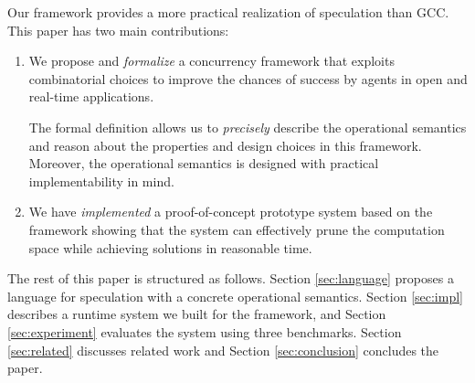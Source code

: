 Our framework provides a more practical realization of speculation than GCC.
%
%
% 
% 
%
This paper has two main contributions:
\begin{enumerate}
\item We propose and {\em formalize} a concurrency framework that 
exploits combinatorial choices to improve the chances of success
by agents in open and real-time applications.

The formal definition allows us to {\em precisely}
describe the operational semantics and reason about the properties and
design choices in this framework.
Moreover, the operational semantics is designed with practical
implementability in mind.
\item We have {\em implemented} a proof-of-concept prototype system 
based on the framework showing
that the system can effectively prune the 
computation space while achieving solutions in reasonable time.
\end{enumerate}

The rest of this paper is structured as follows.
Section \ref{sec:language} proposes a language for speculation
with a concrete operational semantics.
Section \ref{sec:impl} describes a runtime system we
built for the framework, and 
Section \ref{sec:experiment} evaluates the system using
three benchmarks.
Section \ref{sec:related} discusses related work and
Section \ref{sec:conclusion} concludes the paper.
